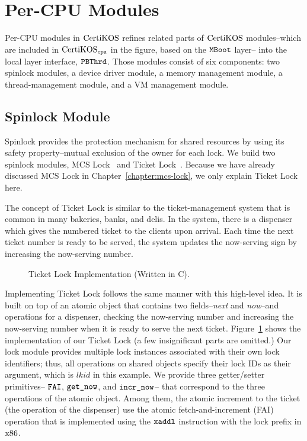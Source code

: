 \section{Per-CPU Modules}
\label{chapter:certikos:sec:per-cpu-modules}

Per-CPU modules in $\mathrm{CertiKOS}$  refines related parts of  $\mathrm{CertiKOS}$ modules--which are included in $\mathrm{CertiKOS}_{{\mathrm{\texttt{cpu}}}}$ in the figure, based on the ${\mathrm{\texttt{MBoot}}}$ layer-- 
into the local layer interface, ${{\mathrm{\texttt{PBThrd}}}}$.
Those modules consist of six components:
two spinlock modules, a device driver module, a memory management module,  a thread-management module, and a VM management module. 

\subsection{Spinlock Module}
\label{chapter:certikos:subsec:spinlock-module}

Spinlock provides the protection mechanism for shared resources by using its safety property--mutual exclusion of the owner for each lock. 
We build two spinlock modules, 
MCS Lock~\cite{mcs91} and Ticket Lock~\cite{lwn:ticketlocks}.
Because we have already discussed MCS Lock in Chapter~\ref{chapter:mcs-lock}, 
we only explain Ticket Lock here.

The concept of Ticket Lock is similar to the ticket-management system that is common in many bakeries, banks, and delis. 
In the system, 
there is a dispenser which gives the numbered ticket to the clients upon arrival. 
Each time the next ticket number is ready to 
be served, 
the system updates the now-serving sign by increasing the now-serving number. 
\begin{figure}
 
\caption{Ticket Lock Implementation (Written in C).}
\label{fig:chapter:certikos:ticket-lock-example}
\end{figure}
Implementing Ticket Lock  follows the same manner with this high-level idea.
It is built on top of an atomic object that contains two fields--\textit{next} and \textit{now}--and operations for a dispenser, checking the now-serving number and increasing the now-serving number when
it is ready to serve the next ticket. 
Figure~\ref{fig:chapter:certikos:ticket-lock-example} shows the implementation of our Ticket Lock (a few insignificant parts are omitted.)
Our lock module provides multiple lock instances associated with their own lock identifiers;
thus, all operations on shared objects specify their lock IDs as their argument, which is $lkid$ in this example.
We provide three getter/setter primitives-- ${\mathrm{\texttt{FAI}}}$, ${\mathrm{\texttt{get\_now}}}$, and ${\mathrm{\texttt{incr\_now}}}$--
that correspond to the three operations of the atomic object.
Among them, the atomic increment to the ticket (the operation of the dispenser) 
use the atomic fetch-and-increment (FAI) operation that is implemented using the ${\mathrm{\texttt{xaddl}}}$ instruction with the 
lock prefix in $\mathrm{x86}$.


